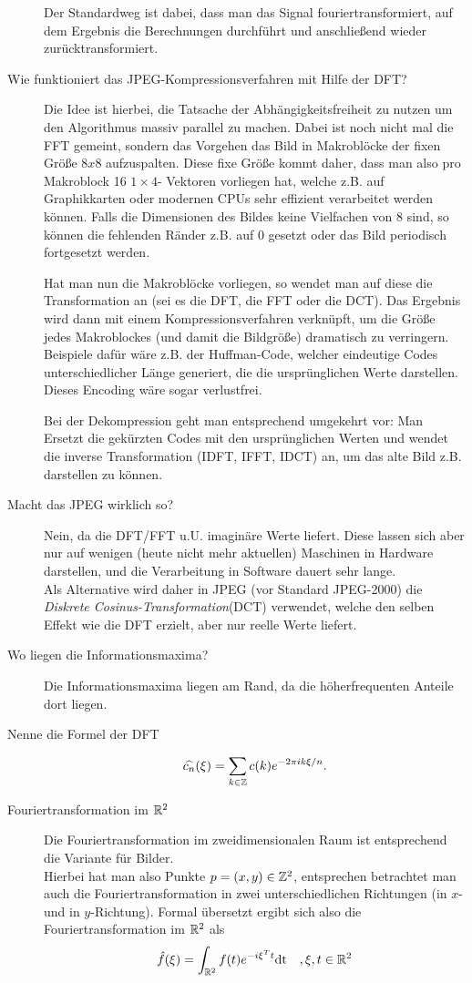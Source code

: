 \begin{description}
      Der Standardweg ist dabei, dass man das Signal fouriertransformiert, auf dem Ergebnis die Berechnungen
      durchführt und anschließend wieder zurücktransformiert.
	\item[Wie funktioniert das JPEG-Kompressionsverfahren mit Hilfe der DFT?]
      Die Idee ist hierbei, die Tatsache der Abhängigkeitsfreiheit zu nutzen um den Algorithmus massiv parallel
      zu machen. Dabei ist noch nicht mal die FFT gemeint, sondern das Vorgehen das Bild in Makroblöcke der
      fixen Größe $8x8$ aufzuspalten. Diese fixe Größe kommt daher, dass man also pro Makroblock 16 $1\times 4$-
      Vektoren vorliegen hat, welche z.B. auf Graphikkarten oder modernen CPUs sehr effizient verarbeitet werden
      können. Falls die Dimensionen des Bildes keine Vielfachen von $8$ sind, so können die fehlenden Ränder
      z.B. auf $0$ gesetzt oder das Bild periodisch fortgesetzt werden.

      Hat man nun die Makroblöcke vorliegen, so wendet man auf diese die Transformation an (sei es die DFT, die
      FFT oder die DCT). Das Ergebnis wird dann mit einem Kompressionsverfahren verknüpft, um die Größe jedes
      Makroblockes (und damit die Bildgröße) dramatisch zu verringern. Beispiele dafür wäre z.B. der Huffman-Code,
      welcher eindeutige Codes unterschiedlicher Länge generiert, die die ursprünglichen Werte darstellen. Dieses
      Encoding wäre sogar verlustfrei.

      Bei der Dekompression geht man entsprechend umgekehrt vor: Man Ersetzt die gekürzten Codes mit den ursprünglichen
      Werten und wendet die inverse Transformation (IDFT, IFFT, IDCT) an, um das alte Bild z.B. darstellen zu können.
    \item[Macht das JPEG wirklich so?]
      Nein, da die DFT/FFT u.U. imaginäre Werte liefert. Diese lassen sich aber nur auf wenigen (heute nicht mehr
      aktuellen) Maschinen in Hardware darstellen, und die Verarbeitung in Software dauert sehr lange.\\
      Als Alternative wird daher in JPEG (vor Standard JPEG-2000) die \emph{Diskrete Cosinus-Transformation}(DCT)
      verwendet, welche den selben Effekt wie die DFT erzielt, aber nur reelle Werte liefert.
	\item[Wo liegen die Informationsmaxima?]
      Die Informationsmaxima liegen am Rand, da die höherfrequenten Anteile dort liegen.
	\item[Nenne die Formel der DFT]
  	\[
    	\widehat{c_{n}}(\xi) = \sum_{k \in \mathbb{Z}} c(k) e^{-2\pi i k \xi / n}.
  	\]
	\item[Fouriertransformation im $\mathbb{R}^2$]
      Die Fouriertransformation im zweidimensionalen Raum ist entsprechend die Variante für Bilder.\\
      Hierbei hat man also Punkte $p = (x, y) \in \mathbb{Z}^2$, entsprechen betrachtet man auch die Fouriertransformation
      in zwei unterschiedlichen Richtungen (in $x$- und in $y$-Richtung). Formal übersetzt ergibt sich also die
      Fouriertransformation im $\mathbb{R}^2$ als
      $$ \hat f(\xi) = \int_{\mathbb{R}^2} f(t)e^{-i \xi^T t}\text{dt}\quad, \xi,t\in\mathbb{R}^2 $$
\end{description}
